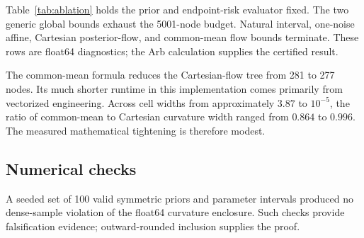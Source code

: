 Table~\ref{tab:ablation} holds the prior and endpoint-risk evaluator fixed.
The two generic global bounds exhaust the 5001-node budget.  Natural interval,
one-noise affine, Cartesian posterior-flow, and common-mean flow bounds
terminate.  These rows are float64 diagnostics; the Arb calculation supplies
the certified result.

\begin{table}[ht]
\centering
\caption{$m=4$, target separator width $10^{-8}$.}
\label{tab:ablation}
\small

\end{table}

The common-mean formula reduces the Cartesian-flow tree from 281 to 277 nodes.
Its much shorter runtime in this implementation comes primarily from
vectorized engineering.  Across cell
widths from approximately $3.87$ to $10^{-5}$, the ratio of common-mean to
Cartesian curvature width ranged from $0.864$ to $0.996$.  The measured
mathematical tightening is therefore modest.

\subsection{Numerical checks}

A seeded set of 100 valid symmetric priors and parameter intervals produced
no dense-sample violation of the float64 curvature enclosure. Such checks
provide falsification evidence; outward-rounded inclusion supplies the proof.
